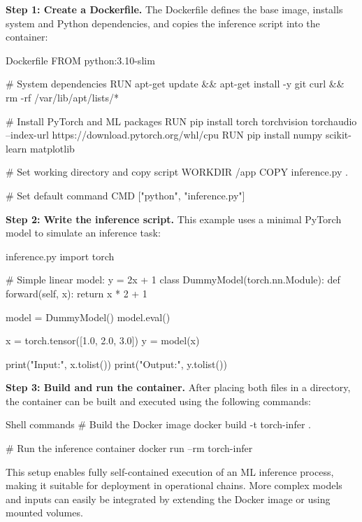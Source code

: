 \vspace{1em}
{\bf Step 1: Create a Dockerfile.} The Dockerfile defines the base image, installs system and Python dependencies, and copies the inference script into the container:

\begin{codeonly}{Dockerfile}
	FROM python:3.10-slim
	
	# System dependencies
	RUN apt-get update && apt-get install -y git curl && rm -rf /var/lib/apt/lists/*
	
	# Install PyTorch and ML packages
	RUN pip install torch torchvision torchaudio --index-url https://download.pytorch.org/whl/cpu
	RUN pip install numpy scikit-learn matplotlib
	
	# Set working directory and copy script
	WORKDIR /app
	COPY inference.py .
	
	# Set default command
	CMD ["python", "inference.py"]
\end{codeonly}

\vspace{1em}
{\bf Step 2: Write the inference script.} This example uses a minimal PyTorch model to simulate an inference task:

\begin{codeonly}{inference.py}
import torch

# Simple linear model: y = 2x + 1
class DummyModel(torch.nn.Module):
    def forward(self, x):
        return x * 2 + 1

model = DummyModel()
model.eval()

x = torch.tensor([1.0, 2.0, 3.0])
y = model(x)

print("Input:", x.tolist())
print("Output:", y.tolist())
\end{codeonly}

\vspace{1em}
{\bf Step 3: Build and run the container.} After placing both files in a directory, the container can be built and executed using the following commands:

\begin{codeonly}{Shell commands}
	# Build the Docker image
	docker build -t torch-infer .
	
	# Run the inference container
	docker run --rm torch-infer
\end{codeonly}

This setup enables fully self-contained execution of an ML inference process, making it suitable for deployment in operational chains. More complex models and inputs can easily be integrated by extending the Docker image or using mounted volumes.




